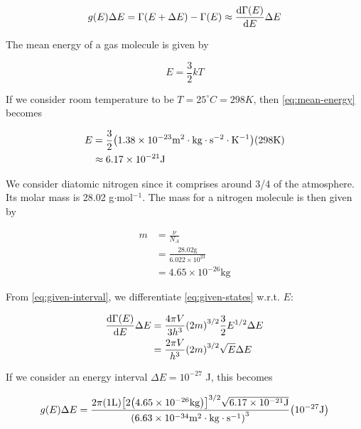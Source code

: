 \documentclass[9pt,a4paper,twocolumn]{article}
\begin{document}
\begin{equation}
	g(E)\Delta E = \Gamma(E+\Delta E) - \Gamma(E) \approx \dv{\Gamma(E)}{E}\Delta E \label{eq:given-interval}
\end{equation}

The mean energy of a gas molecule is given by

\begin{equation}
	E = \frac{3}{2}kT \label{eq:mean-energy}
\end{equation}

If we consider room temperature to be $T = 25^\circ C = 298 K$, then \eqref{eq:mean-energy} becomes

\begin{align}
	E &= \frac{3}{2}\qty(1.38\times 10^{-23} \mathrm{m^2\cdot kg\cdot s^{-2}\cdot K^{-1}})\qty(298 \mathrm{K}) \nonumber \\
	&\approx 6.17\times 10^{-21} \mathrm{J} \label{eq:answer-energy}
\end{align}

We consider diatomic nitrogen since it comprises around 3/4 of the atmosphere. Its molar mass is 28.02 g$\cdot$mol$^{-1}$. The mass for a nitrogen molecule is then given by

\begin{align}
	m &= \frac{\nu}{N_A} \nonumber \\
	&= \frac{28.02\mathrm{g}}{6.022\times 10^{23}} \nonumber \\
	&= 4.65\times 10^{-26} \mathrm{kg} \label{eq:answer-mass}
\end{align}

From \eqref{eq:given-interval}, we differentiate \eqref{eq:given-states} w.r.t. $E$:

\begin{align}
	\dv{\Gamma(E)}{E}\Delta E &= \frac{4\pi V}{3h^3}\qty(2m)^{3/2} \frac{3}{2}E^{1/2} \Delta E \nonumber \\
	&= \frac{2\pi V}{h^3}\qty(2m)^{3/2}\sqrt{E}\Delta E \nonumber
\end{align}

If we consider an energy interval $\Delta E = 10^{-27}$ J, this becomes

\begin{equation}
	g(E)\Delta E = \frac{2\pi\qty(1\mathrm{ L})\qty[2\qty(4.65\times 10^{-26}\mathrm{ kg})]^{3/2}\sqrt{6.17\times 10^{-21}\mathrm{ J}}}{\qty(6.63\times 10^{-34}\mathrm{ m^2\cdot kg\cdot s^{-1}})^3}\qty(10^{-27}\mathrm{ J}) \nonumber
\end{equation}
\end{document}
